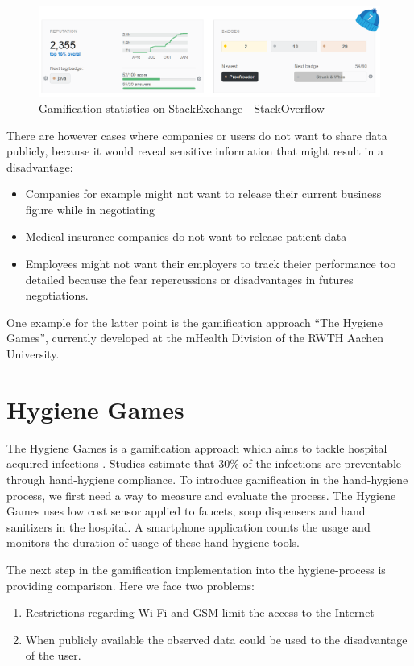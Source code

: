 \begin{figure}[!htb] %
	\caption[StackExchange - StackOverflow]{Gamification statistics on StackExchange - StackOverflow} \label{figure:StackOverflow}
	\includegraphics[scale=1.0]{figures/stackoverflow.png}
\end{figure}

There are however cases where companies or users do not want to share data publicly, because it would reveal sensitive information that might result in a disadvantage:
\begin{itemize}
	\item Companies for example might not want to release their current business figure while in negotiating
	\item Medical insurance companies do not want to release patient data
	\item Employees might not want their employers to track theier performance too detailed because the fear repercussions or disadvantages in futures negotiations.
\end{itemize}

One example for the latter point is the gamification approach ``The Hygiene Games'', currently developed at the mHealth Division of the RWTH Aachen University.

\section{Hygiene Games} \label{Hygiene Games}

The Hygiene Games is a gamification approach which aims to tackle hospital acquired infections \autocite{Klein2016}. Studies estimate that 30\% of the infections are preventable through hand-hygiene compliance. To introduce gamification in the hand-hygiene process, we first need a way to measure and evaluate the process. The Hygiene Games uses low cost sensor applied to faucets, soap dispensers and hand sanitizers in the hospital. A smartphone application counts the usage and monitors the duration of usage of these hand-hygiene tools.

The next step in the gamification implementation into the hygiene-process is providing comparison. Here we face two problems:
\begin{enumerate}
	\item Restrictions regarding Wi-Fi and \gls{GSM} limit the access to the Internet
	\item When publicly available the observed data could be used to the disadvantage of the user.
\end{enumerate}


